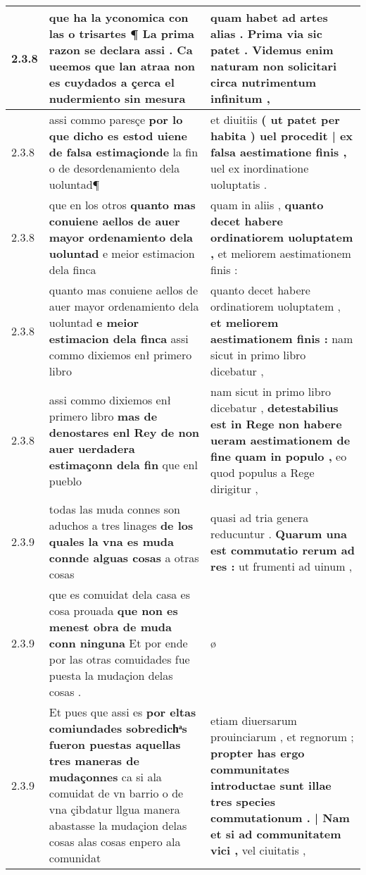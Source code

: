 \begin{tabular}{|p{1cm}|p{6.5cm}|p{6.5cm}|}
2.3.8 & que ha la yconomica con las o trisartes ¶ \textbf{ La prima razon se declara assi . Ca ueemos que lan atraa non es cuydados } a çerca el nudermiento sin mesura & quam habet ad artes alias . \textbf{ Prima via sic patet . } Videmus enim naturam non solicitari circa nutrimentum infinitum , \\\hline
2.3.8 & assi commo paresçe \textbf{ por lo que dicho es estod uiene de falsa estimaçionde } la fin o de desordenamiento dela uoluntad¶ & et diuitiis \textbf{ ( ut patet per habita ) uel procedit | ex falsa aestimatione finis , } uel ex inordinatione uoluptatis . \\\hline
2.3.8 & que en los otros \textbf{ quanto mas conuiene aellos de auer mayor ordenamiento dela uoluntad } e meior estimacion dela finca & quam in aliis , \textbf{ quanto decet habere ordinatiorem uoluptatem , } et meliorem aestimationem finis : \\\hline
2.3.8 & quanto mas conuiene aellos de auer mayor ordenamiento dela uoluntad \textbf{ e meior estimacion dela finca } assi commo dixiemos enł primero libro & quanto decet habere ordinatiorem uoluptatem , \textbf{ et meliorem aestimationem finis : } nam sicut in primo libro dicebatur , \\\hline
2.3.8 & assi commo dixiemos enł primero libro \textbf{ mas de denostares enl Rey de non auer uerdadera estimaçonn dela fin } que enl pueblo & nam sicut in primo libro dicebatur , \textbf{ detestabilius est in Rege non habere ueram aestimationem de fine quam in populo , } eo quod populus a Rege dirigitur , \\\hline
2.3.9 & todas las muda connes son aduchos a tres linages \textbf{ de los quales la vna es muda connde alguas cosas } a otras cosas & quasi ad tria genera reducuntur . \textbf{ Quarum una est commutatio rerum ad res : } ut frumenti ad uinum , \\\hline
2.3.9 & que es comuidat dela casa es cosa prouada \textbf{ que non es menest obra de muda conn ninguna } Et por ende por las otras comuidades fue puesta la mudaçion delas cosas . & ø \\\hline
2.3.9 & Et pues que assi es \textbf{ por eltas comiundades sobredichͣs fueron puestas aquellas tres maneras de mudaçonnes } ca si ala comuidat de vn barrio o de vna çibdatur llgua manera abastasse la mudaçion delas cosas alas cosas enpero ala comunidat & etiam diuersarum prouinciarum , et regnorum ; \textbf{ propter has ergo communitates introductae sunt illae tres species commutationum . | Nam et si ad communitatem vici , } vel ciuitatis , \\\hline

\end{tabular}
